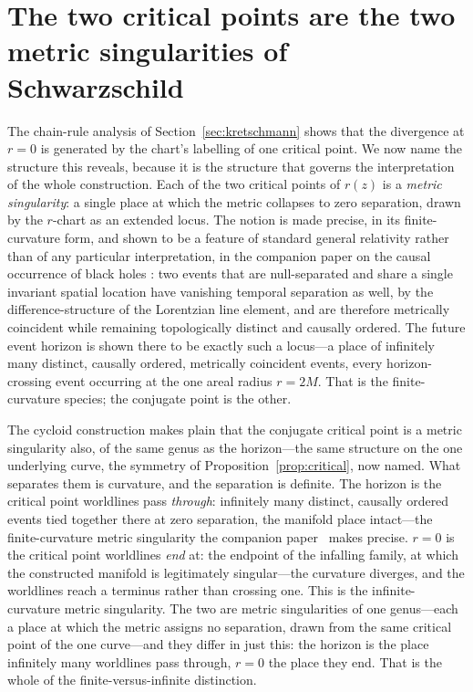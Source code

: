\documentclass[11pt,a4paper]{article}
\theoremstyle{definition}
\begin{document}
\section{The two critical points are the two metric singularities of Schwarzschild}\label{sec:metric-singularities}

The chain-rule analysis of Section~\ref{sec:kretschmann} shows that the divergence at $r=0$ is generated by the chart's labelling of one critical point. We now name the structure this reveals, because it is the structure that governs the interpretation of the whole construction. Each of the two critical points of $r(z)$ is a \emph{metric singularity}: a single place at which the metric collapses to zero separation, drawn by the $r$-chart as an extended locus. The notion is made precise, in its finite-curvature form, and shown to be a feature of standard general relativity rather than of any particular interpretation, in the companion paper on the causal occurrence of black holes \cite{JanzenBHcausality}: two events that are null-separated and share a single invariant spatial location have vanishing temporal separation as well, by the difference-structure of the Lorentzian line element, and are therefore metrically coincident while remaining topologically distinct and causally ordered. The future event horizon is shown there to be exactly such a locus---a place of infinitely many distinct, causally ordered, metrically coincident events, every horizon-crossing event occurring at the one areal radius $r=2M$. That is the finite-curvature species; the conjugate point is the other.

The cycloid construction makes plain that the conjugate critical point is a metric singularity also, of the same genus as the horizon---the same structure on the one underlying curve, the symmetry of Proposition~\ref{prop:critical}, now named. What separates them is curvature, and the separation is definite. The horizon is the critical point worldlines pass \emph{through}: infinitely many distinct, causally ordered events tied together there at zero separation, the manifold place intact---the finite-curvature metric singularity the companion paper~\cite{JanzenBHcausality} makes precise. $r=0$ is the critical point worldlines \emph{end} at: the endpoint of the infalling family, at which the constructed manifold is legitimately singular---the curvature diverges, and the worldlines reach a terminus rather than crossing one. This is the infinite-curvature metric singularity. The two are metric singularities of one genus---each a place at which the metric assigns no separation, drawn from the same critical point of the one curve---and they differ in just this: the horizon is the place infinitely many worldlines pass through, $r=0$ the place they end. That is the whole of the finite-versus-infinite distinction.
\end{document}

